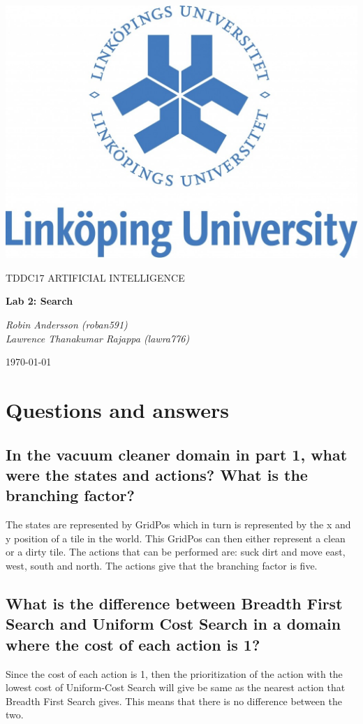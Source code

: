 \documentclass[a4paper,10pt]{article}
\begin{document}
\begin{titlepage}
	\centering
	\includegraphics[width=.6\textwidth]{liu-logo.png}\par
	\vfill
	{\scshape\Large TDDC17 ARTIFICIAL INTELLIGENCE\par}
	{\huge\bfseries Lab 2: Search\par}
	\vspace{1cm}
	{\large\itshape Robin Andersson (roban591) \\ Lawrence Thanakumar Rajappa (lawra776)\par}
	\vfill
	{\large \today\par}
\end{titlepage}

\section{Questions and answers}

\subsection{In the vacuum cleaner domain in part 1, what were the states and actions? What is the branching factor?}

The states are represented by GridPos which in turn is represented by the x and y position of a tile in the world.
This GridPos can then either represent a clean or a dirty tile.
The actions that can be performed are: suck dirt and move east, west, south and north.
The actions give that the branching factor is five.

\subsection{What is the difference between Breadth First Search and Uniform Cost Search in a domain where the cost of each action is 1?}

Since the cost of each action is 1, then the prioritization of the action with the lowest cost of Uniform-Cost Search will
give be same as the nearest action that Breadth First Search gives.
This means that there is no difference between the two.
\end{document}
